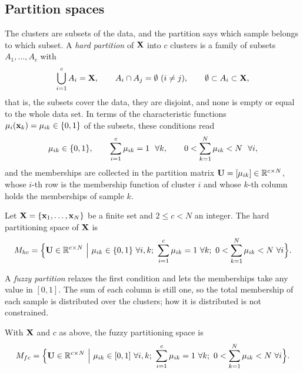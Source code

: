 \subsection{Partition spaces}\label{sec:found:partitions}

The clusters are subsets of the data, and the partition says which sample belongs to which subset. A \emph{hard partition} of $\mathbf{X}$ into $c$ clusters is a family of subsets $A_1,\dots,A_c$ with
\begin{equation}
  \bigcup_{i=1}^{c}A_i=\mathbf{X},\qquad A_i\cap A_j=\emptyset\ (i\ne j),\qquad \emptyset\subset A_i\subset\mathbf{X},
  \label{eq:found:hardsets}
\end{equation}
that is, the subsets cover the data, they are disjoint, and none is empty or equal to the whole data set. In terms of the characteristic functions $\mu_i(\mathbf{x}_k)=\mu_{ik}\in\{0,1\}$ of the subsets, these conditions read
\begin{equation}
  \mik\in\{0,1\},\qquad \sum_{i=1}^{c}\mik=1\ \ \forall k,\qquad 0<\sum_{k=1}^{N}\mik<N\ \ \forall i,
  \label{eq:found:hardmu}
\end{equation}
and the memberships are collected in the partition matrix $\mathbf{U}=[\mu_{ik}]\in\mathbb{R}^{c\times N}$, whose $i$-th row is the membership function of cluster $i$ and whose $k$-th column holds the memberships of sample $k$.
\begin{definition}\label{def:found:mhc}
Let $\mathbf{X}=\{\mathbf{x}_1,\dots,\mathbf{x}_N\}$ be a finite set and $2\le c<N$ an integer. The hard partitioning space of $\mathbf{X}$ is
\begin{equation}
  M_{hc}=\Bigl\{\U\in\R^{c\times N}\ \Big|\ \mik\in\{0,1\}\ \forall i,k;\ \sum_{i=1}^{c}\mik=1\ \forall k;\ 0<\sum_{k=1}^{N}\mik<N\ \forall i\Bigr\}.
  \label{eq:found:mhc}
\end{equation}
\end{definition}
A \emph{fuzzy partition} \cite{ruspini:1969} relaxes the first condition and lets the memberships take any value in $[0,1]$. The sum of each column is still one, so the total membership of each sample is distributed over the clusters; how it is distributed is not constrained.
\begin{definition}\label{def:found:mfc}
With $\mathbf{X}$ and $c$ as above, the fuzzy partitioning space is
\begin{equation}
  M_{fc}=\Bigl\{\U\in\R^{c\times N}\ \Big|\ \mik\in[0,1]\ \forall i,k;\ \sum_{i=1}^{c}\mik=1\ \forall k;\ 0<\sum_{k=1}^{N}\mik<N\ \forall i\Bigr\}.
  \label{eq:found:mfc}
\end{equation}
\end{definition}
